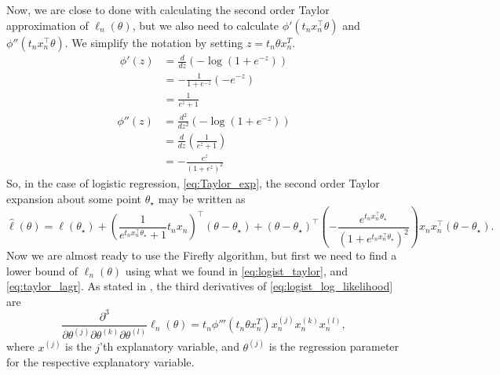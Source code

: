 Now, we are close to done with calculating the second order Taylor approximation of $\ell_n\left(\theta\right)$, but we also need to calculate $\phi'\left(t_n x_n^{\top}\theta \right)$ and $\phi''\left(t_n x_n^{\top}\theta \right)$. We simplify the notation by setting $z = t_n\theta x_n^T$. 
\begin{equation}\label{eq:logist_first_der} 
\begin{split}
\phi'\left(z\right) &= \frac{d}{dz} \left( - \log\left(1 + e^{-z}\right)\right)\\ &= - \frac{1}{1 + e^{-z}} \left(-e^{-z}\right) \\
& = \frac{1}{e^z + 1}
\end{split}
\end{equation}
\begin{equation}\label{eq:loglist_second_der}
    \begin{split}
       \phi''\left(z\right) & = \frac{d^2}{dz^2}\left(-\log\left(1 + e^{-z} \right)\right) \\
        & = \frac{d}{dz} \left(\frac{1}{e^z +1}\right) \\
        & = -\frac{e^z}{\left(1 + e^z\right)^2} 
\end{split} 
\end{equation}
So, in the case of logistic regression, \eqref{eq:Taylor_exp}, the second order Taylor expansion about some point $\theta_{\star}$ may be written as 
\begin{equation}\label{eq:logist_taylor}
    \hat{\ell}\left(\theta\right)= \ell\left(\theta_{\star}\right) + \left(\frac{1}{e^{t_n x_n^{\top}\theta_{\star} } + 1} t_n x_n\right)^{\top}
    \left(\theta - \theta_{\star} \right) 
    + \left(\theta - \theta_{\star}\right)^{\top}
    \left(-\frac{e^{t_n x_n^{\top}\theta_{\star} }}{\left(1 + e^{t_n x_n^{\top}\theta_{\star} }\right)^2}\right)x_n x_n^{\top} \left(\theta - \theta_{\star}\right).  
\end{equation}{}
Now we are almost ready to use the Firefly algorithm, but first we need to find a lower bound of $\ell_n\left(\theta\right)$ using what we found in \eqref{eq:logist_taylor}, and \eqref{eq:taylor_lagr}.  
As stated in \cite{Bardenet:1}, the third derivatives of \eqref{eq:logist_log_likelihood} are 
\begin{equation}\label{eq:logist_third_der}
    \frac{\partial^3}{\partial\theta^{\left(j\right)}\partial \theta^{\left(k\right)}\partial\theta^{\left(l\right)}}  \ell_n\left(\theta\right)= t_n \phi'''\left(t_n\theta x_n^T\right) x_n^{\left(j\right)}x_n^{\left(k\right)}x_n^{\left(l\right)},
\end{equation} where $x^{\left(j\right)}$ is the $j$'th explanatory variable, and $\theta^{\left(j\right)}$ is the regression parameter for the respective explanatory variable. 
